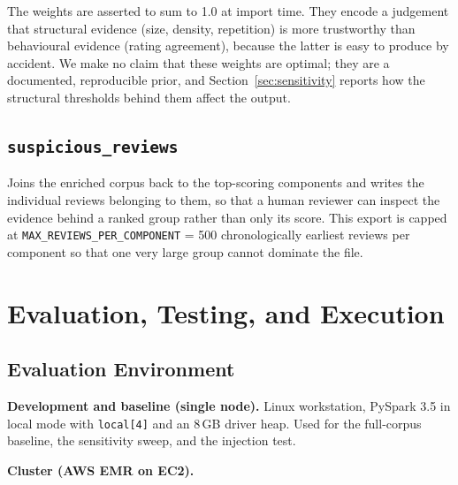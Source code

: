 \documentclass[12pt]{article}
\begin{document}
The weights are asserted to sum to 1.0 at import time. They encode a judgement
that structural evidence (size, density, repetition) is more trustworthy than
behavioural evidence (rating agreement), because the latter is easy to produce
by accident. We make no claim that these weights are optimal; they are a
documented, reproducible prior, and
Section~\ref{sec:sensitivity} reports how the structural thresholds behind
them affect the output.

\subsection{\texttt{suspicious\_reviews}}

Joins the enriched corpus back to the top-scoring components and writes the
individual reviews belonging to them, so that a human reviewer can inspect the
evidence behind a ranked group rather than only its score. This export is
capped at \texttt{MAX\_REVIEWS\_PER\_COMPONENT} = 500 chronologically earliest
reviews per component so that one very large group cannot dominate the file.

\section{Evaluation, Testing, and Execution}

\subsection{Evaluation Environment}

\textbf{Development and baseline (single node).} Linux workstation, PySpark
3.5 in local mode with \texttt{local[4]} and an 8\,GB driver heap. Used for the
full-corpus baseline, the sensitivity sweep, and the injection test.

\textbf{Cluster (AWS EMR on EC2).}
\end{document}
